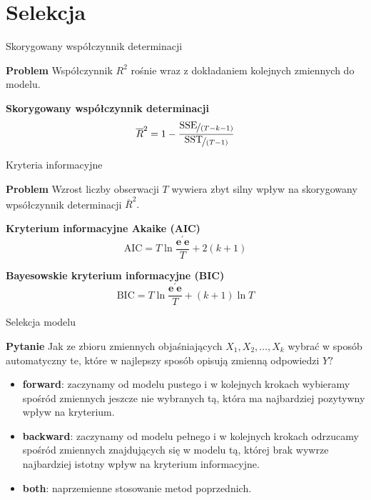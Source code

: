 \documentclass[a4paper, 11pt]{beamer}
\begin{document}
	\section{Selekcja}
	
	\begin{frame}{Skorygowany współczynnik determinacji}

		\begin{alert}{\textbf{Problem}}
			Współczynnik $R^2$ rośnie wraz z dokładaniem kolejnych zmiennych do modelu.
		\end{alert}

		\begin{block}{\textbf{Skorygowany współczynnik determinacji}}
			\[
				\overline{R}^2 = 1 - \frac{\nicefrac{\mbox{SSE}}{\left(T - k - 1\right)}}{\nicefrac{\mbox{SST}}{\left(T - 1\right)}}
			\]
		\end{block}
	\end{frame}

	\begin{frame}{Kryteria informacyjne}
		\begin{alert}{\textbf{Problem}}
			Wzrost liczby obserwacji $T$ wywiera zbyt silny wpływ na skorygowany wpsółczynnik determinacji $\overline{R}^2.$
		\end{alert}
	
		\begin{block}{\textbf{Kryterium informacyjne Akaike (AIC)}}
			\[
				\mbox{AIC} = T \ln \frac{\boldsymbol{e}^{\prime}\boldsymbol{e}}{T} + 2\left(k + 1\right)
			\]
		\end{block}
		
		\begin{block}{\textbf{Bayesowskie kryterium informacyjne (BIC)}}
			\[
				\mbox{BIC} = T \ln \frac{\boldsymbol{e}^{\prime}\boldsymbol{e}}{T} + \left(k + 1\right) \ln T
			\]
		\end{block}
		
	\end{frame}
	
	\begin{frame}{Selekcja modelu}
		\begin{block}{\textbf{Pytanie}}
			Jak ze zbioru zmiennych objaśniających $X_1, X_2, \ldots, X_k$ wybrać w sposób automatyczny te,
			które w najlepszy sposób opisują zmienną odpowiedzi $Y?$
		\end{block}
		
		\begin{itemize}
			\item \textbf{forward}: zaczynamy od modelu pustego i w kolejnych krokach wybieramy spośród zmiennych jeszcze nie wybranych tą, która ma
				najbardziej pozytywny wpływ na kryterium.
			\item \textbf{backward}: zaczynamy od modelu pełnego i w kolejnych krokach odrzucamy spośród zmiennych znajdujących się w modelu tą, której
				brak wywrze najbardziej istotny wpływ na kryterium informacyjne.
			\item \textbf{both}: naprzemienne stosowanie metod poprzednich.
		\end{itemize}
	\end{frame}
	
\end{document}

